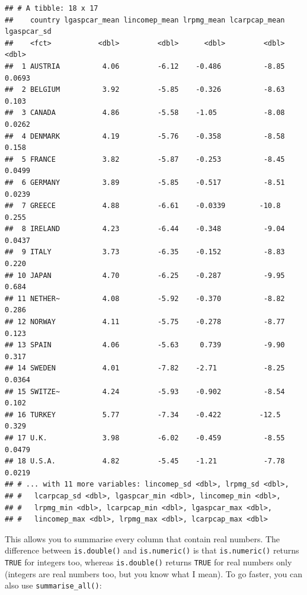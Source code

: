 \documentclass[]{gitbook}
\newenvironment{Shaded}{\begin{snugshade}}{\end{snugshade}}
\newcommand{\KeywordTok}[1]{\textcolor[rgb]{0.13,0.29,0.53}{\textbf{#1}}}
\newcommand{\NormalTok}[1]{#1}
\newcommand{\OperatorTok}[1]{\textcolor[rgb]{0.81,0.36,0.00}{\textbf{#1}}}
\newcommand{\StringTok}[1]{\textcolor[rgb]{0.31,0.60,0.02}{#1}}
\theoremstyle{definition}
\theoremstyle{definition}
\theoremstyle{definition}
\theoremstyle{remark}
\begin{document}
\begin{verbatim}
## # A tibble: 18 x 17
##    country lgaspcar_mean lincomep_mean lrpmg_mean lcarpcap_mean lgaspcar_sd
##    <fct>           <dbl>         <dbl>      <dbl>         <dbl>       <dbl>
##  1 AUSTRIA          4.06         -6.12    -0.486          -8.85      0.0693
##  2 BELGIUM          3.92         -5.85    -0.326          -8.63      0.103 
##  3 CANADA           4.86         -5.58    -1.05           -8.08      0.0262
##  4 DENMARK          4.19         -5.76    -0.358          -8.58      0.158 
##  5 FRANCE           3.82         -5.87    -0.253          -8.45      0.0499
##  6 GERMANY          3.89         -5.85    -0.517          -8.51      0.0239
##  7 GREECE           4.88         -6.61    -0.0339        -10.8       0.255 
##  8 IRELAND          4.23         -6.44    -0.348          -9.04      0.0437
##  9 ITALY            3.73         -6.35    -0.152          -8.83      0.220 
## 10 JAPAN            4.70         -6.25    -0.287          -9.95      0.684 
## 11 NETHER~          4.08         -5.92    -0.370          -8.82      0.286 
## 12 NORWAY           4.11         -5.75    -0.278          -8.77      0.123 
## 13 SPAIN            4.06         -5.63     0.739          -9.90      0.317 
## 14 SWEDEN           4.01         -7.82    -2.71           -8.25      0.0364
## 15 SWITZE~          4.24         -5.93    -0.902          -8.54      0.102 
## 16 TURKEY           5.77         -7.34    -0.422         -12.5       0.329 
## 17 U.K.             3.98         -6.02    -0.459          -8.55      0.0479
## 18 U.S.A.           4.82         -5.45    -1.21           -7.78      0.0219
## # ... with 11 more variables: lincomep_sd <dbl>, lrpmg_sd <dbl>,
## #   lcarpcap_sd <dbl>, lgaspcar_min <dbl>, lincomep_min <dbl>,
## #   lrpmg_min <dbl>, lcarpcap_min <dbl>, lgaspcar_max <dbl>,
## #   lincomep_max <dbl>, lrpmg_max <dbl>, lcarpcap_max <dbl>
\end{verbatim}

This allows you to summarise every column that contain real numbers. The
difference between \texttt{is.double()} and \texttt{is.numeric()} is
that \texttt{is.numeric()} returns \texttt{TRUE} for integers too,
whereas \texttt{is.double()} returns \texttt{TRUE} for real numbers only
(integers are real numbers too, but you know what I mean). To go faster,
you can also use \texttt{summarise\_all()}:

\begin{Shaded}
\end{Shaded}
\end{document}
